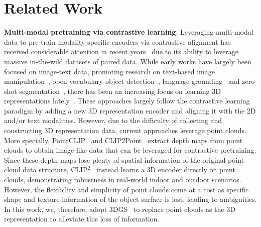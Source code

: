 

\section{Related Work}
\label{sec:related_work}

  \textbf{Multi-modal pretraining via contrastive learning}. Leveraging multi-modal data to pre-train modality-specific encoders via contrastive alignment has received considerable attention in recent years~\citep{radford2021learning, mu2022slip} due to its ability to leverage massive in-the-wild datasets of paired data. While early works have largely been focused on image-text data, promoting research on text-based image manipulation~\citep{patashnik2021styleclip}, open vocabulary object detection~\citep{gu2021open, gao2022open}, language grounding~\citep{li2022grounded} and zero-shot segmentation~\citep{xu2023open}, there has been an increasing focus on learning 3D representations lately~\citep{xue2023ulip, xue2023ulip2, zeng2023clip2, zhou2024uni3d}. These approaches largely follow the contrastive learning paradigm by adding a new 3D representation encoder and aligning it with the 2D and/or text modalities. However, due to the difficulty of collecting and constructing 3D representation data, current approaches leverage point clouds. 
  More specially, PointCLIP~\citep{zhang2022pointclip} and CLIP2Point~\citep{huang2023clip2point} extract depth maps from point clouds to obtain image-like data that can be leveraged for contrastive pretraining.
  Since these depth maps lose plenty of spatial information of the original point cloud data structure, CLIP$^2$~\citep{zeng2023clip2} instead learns a 3D encoder directly on point clouds, demonstrating robustness in real-world indoor and outdoor scenarios. However, the flexibility and simplicity of point clouds come at a cost as specific shape and texture information of the object surface is lost, leading to ambiguities. In this work, we, therefore, adopt 3DGS~\citep{kerbl20233d} to replace point clouds as the 3D representation to alleviate this loss of information.
    
